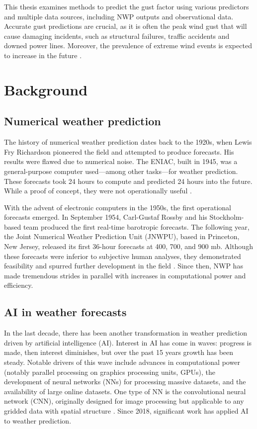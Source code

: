 This thesis examines methods to predict the gust factor using various predictors and multiple data sources, including NWP outputs and observational data. Accurate gust predictions are crucial, as it is often the peak wind gust that will cause damaging incidents, such as structural failures, traffic accidents and downed power lines. Moreover, the prevalence of extreme wind events is expected to increase in the future \cite{nasa_extreme_weather}.

\section{Background}

\subsection{Numerical weather prediction}
The history of numerical weather prediction dates back to the 1920s, when Lewis Fry Richardson pioneered the field and attempted to produce forecasts. His results were flawed due to numerical noise. The ENIAC, built in 1945, was a general-purpose computer used—among other tasks—for weather prediction. These forecasts took 24 hours to compute and predicted 24 hours into the future. While a proof of concept, they were not operationally useful \cite{TheENIACForecastsARecreation}. 

With the advent of electronic computers in the 1950s, the first operational forecasts emerged. In September 1954, Carl-Gustaf Rossby and his Stockholm-based team produced the first real-time barotropic forecasts. The following year, the Joint Numerical Weather Prediction Unit (JNWPU), based in Princeton, New Jersey, released its first 36-hour forecasts at 400, 700, and 900 mb. Although these forecasts were inferior to subjective human analyses, they demonstrated feasibility and spurred further development in the field \cite{historyNWP}. Since then, NWP has made tremendous strides in parallel with increases in computational power and efficiency.

\subsection{AI in weather forecasts}
In the last decade, there has been another transformation in weather prediction driven by artificial intelligence (AI). Interest in AI has come in waves: progress is made, then interest diminishes, but over the past 15 years growth has been steady. Notable drivers of this wave include advances in computational power (notably parallel processing on graphics processing units, GPUs), the development of neural networks (NNs) for processing massive datasets, and the availability of large online datasets. One type of NN is the convolutional neural network (CNN), originally designed for image processing but applicable to any gridded data with spatial structure \cite{canNNBeatNWP}. Since 2018, significant work has applied AI to weather prediction.

